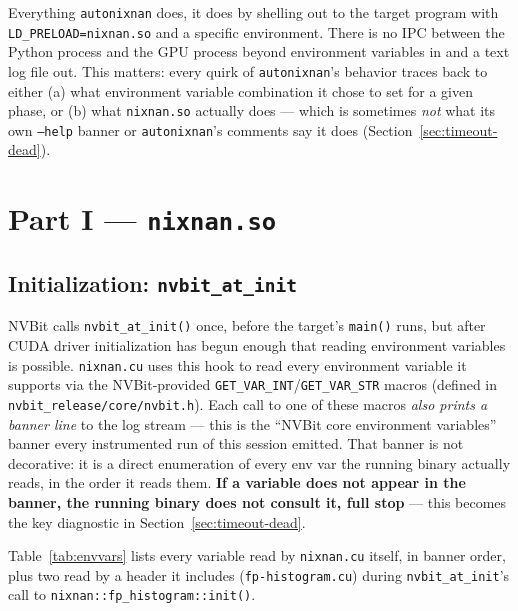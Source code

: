 \documentclass[11pt]{article}
\begin{document}
Everything \texttt{autonixnan} does, it does by shelling out to the
target program with \texttt{LD\_PRELOAD=nixnan.so} and a specific
environment. There is no IPC between the Python process and the GPU
process beyond environment variables in and a text log file out. This
matters: every quirk of \texttt{autonixnan}'s behavior traces back to
either (a) what environment variable combination it chose to set for a
given phase, or (b) what \texttt{nixnan.so} actually does --- which is
sometimes \emph{not} what its own \texttt{--help} banner or
\texttt{autonixnan}'s comments say it does (Section~\ref{sec:timeout-dead}).

\section{Part I --- \texttt{nixnan.so}}

\subsection{Initialization: \texttt{nvbit\_at\_init}}

NVBit calls \texttt{nvbit\_at\_init()} once, before the target's
\texttt{main()} runs, but after CUDA driver initialization has begun
enough that reading environment variables is possible. \texttt{nixnan.cu}
uses this hook to read every environment variable it supports via the
NVBit-provided \texttt{GET\_VAR\_INT}/\texttt{GET\_VAR\_STR} macros
(defined in \texttt{nvbit\_release/core/nvbit.h}). Each call to one of
these macros \emph{also prints a banner line} to the log stream --- this
is the ``NVBit core environment variables'' banner every instrumented run
of this session emitted. That banner is not decorative: it is a direct
enumeration of every env var the running binary actually reads, in the
order it reads them. \textbf{If a variable does not appear in the banner,
the running binary does not consult it, full stop} --- this becomes the
key diagnostic in Section~\ref{sec:timeout-dead}.

Table~\ref{tab:envvars} lists every variable read by \texttt{nixnan.cu}
itself, in banner order, plus two read by a header it includes
(\texttt{fp-histogram.cu}) during \texttt{nvbit\_at\_init}'s call to
\texttt{nixnan::fp\_histogram::init()}.
\end{document}
